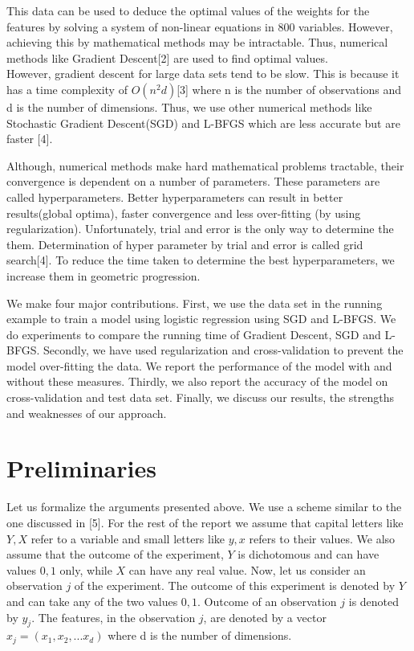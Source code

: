 \documentclass{acm_proc_article-sp}
\begin{document}
This data can be used to deduce the optimal values of the weights for the features by solving a system of non-linear equations in 800 variables. However, achieving this by mathematical methods may be intractable. Thus, numerical methods like Gradient Descent[2] are used to find optimal values. \\
However, gradient descent for large data sets tend to be slow. This is because it has a time complexity of $O(n^{2}d)$[3] where n is the number of observations and d is the number of dimensions. Thus, we use other numerical methods like Stochastic Gradient Descent(SGD) and L-BFGS which are less accurate but are faster [4].

Although, numerical methods make hard mathematical problems tractable, their convergence is dependent on a number of parameters. These parameters are called hyperparameters. Better hyperparameters can result in better results(global optima), faster convergence and less over-fitting (by using regularization). Unfortunately, trial and error is the only way to determine the them. Determination of hyper parameter by trial and error is called grid search[4]. To reduce the time taken to determine the best hyperparameters, we increase them in geometric progression.

We make four major contributions. First, we use the data set in the running example to train a model using logistic regression using SGD and L-BFGS. We do experiments to compare the running time of Gradient Descent, SGD and L-BFGS. Secondly, we have used regularization and cross-validation to prevent the model over-fitting the data. We report the performance of the model with and without these measures. Thirdly, we also report the accuracy of the model on cross-validation and test data set. Finally, we discuss our results, the strengths and weaknesses of our approach.

\section{Preliminaries}
Let us formalize the arguments presented above. We use a scheme similar to the one discussed in [5]. For the rest of the report we assume that capital letters like $Y, X$ refer to a variable and small letters like $y, x$ refers to their values. We also assume that the outcome of the experiment, $Y$ is dichotomous and can have values ${0,1}$ only, while $X$ can have any real value. Now, let us consider an observation $j$ of the experiment. The outcome of this experiment is denoted by $Y$ and can take any of the two values ${0,1}$. Outcome of an observation $j$ is denoted by $y_{j}$. The features, in the observation $j$, are denoted by a vector $x_{j}=(x_{1}, x_{2},...x_{d})$ where d is the number of dimensions. 
\end{document}

